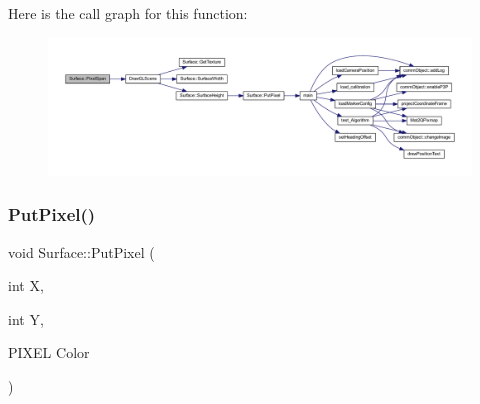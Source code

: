 Here is the call graph for this function\+:\nopagebreak
\begin{figure}[H]
\begin{center}
\leavevmode
\includegraphics[width=350pt]{class_surface_abe0d542404575c60911d6ad4219560f9_cgraph}
\end{center}
\end{figure}
\mbox{\label{class_surface_a728571d0386e9690ce1760931562c72b}} 
\subsubsection{Put\+Pixel()}
{\footnotesize\ttfamily void Surface\+::\+Put\+Pixel (\begin{DoxyParamCaption}\item[{int}]{X,  }\item[{int}]{Y,  }\item[{P\+I\+X\+EL}]{Color }\end{DoxyParamCaption})}

